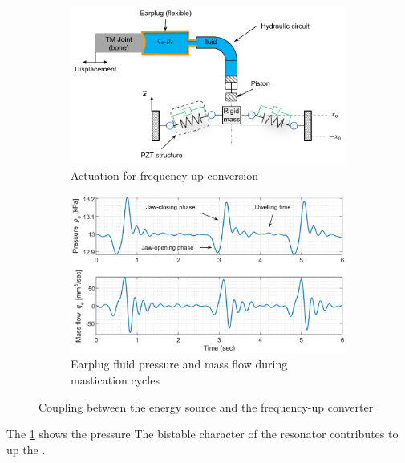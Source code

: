 \documentclass[3p,twocolumn,preprint]{elsarticle}
\begin{document}
\begin{figure}[!htbp]
\begin{center}
\captionsetup{justification=centering}
\begin{subfigure} [h!]{0.49\textwidth}
	\includegraphics[width=\textwidth]{figures/masse_piston.png}
	\caption{Actuation for frequency-up conversion} \label{fig:deltaV}
\end{subfigure}
\begin{subfigure}[h!]{0.49\textwidth}
	\includegraphics[width=\textwidth]{figures/deltaV.png}
	\caption{Earplug fluid pressure  and mass flow during mastication cycles}  \label{fig:mass_piston}
\end{subfigure}
\caption{Coupling between the energy source and the frequency-up converter}
\end{center}
\label{fig:frequency-up}
\end{figure}
\FloatBarrier
The \cref{fig:deltaV} shows the pressure
The bistable character of the resonator contributes to up the .
\end{document}
